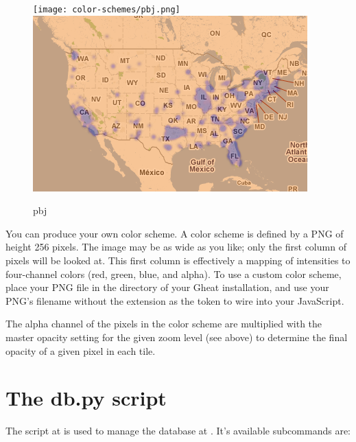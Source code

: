 \documentclass{manual}
\begin{document}
\begin{figure}[htp]
\texttt{[image: color-schemes/pbj.png]}
\includegraphics[bb=0 0 400 256]{img/cs-pbj.png}
\caption{pbj}\label{fig:pbj}
\end{figure}

You can produce your own color scheme. A color scheme is defined by a PNG of
height 256 pixels. The image may be as wide as you like; only the first column
of pixels will be looked at. This first column is effectively a mapping of
intensities to four-channel colors (red, green, blue, and alpha). To use a
custom color scheme, place your PNG file in the 
directory of your Gheat installation, and use your PNG's filename without the
 extension as the token to wire into your JavaScript.

The alpha channel of the pixels in the color scheme are multiplied with the
master opacity setting for the given zoom level (see above) to determine the 
final opacity of a given pixel in each tile.

\begin{seealso}



\end{seealso}


\chapter{The db.py script}
\label{db.py}

The script at  is used to manage the database at 
. It's available subcommands are:
\end{document}
